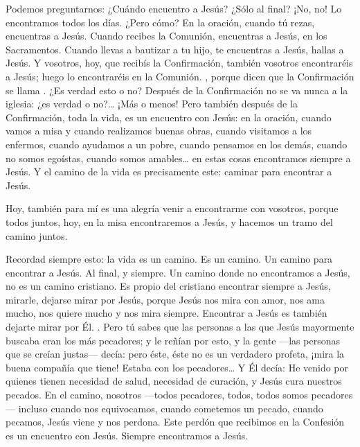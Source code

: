 Podemos preguntarnos: ¿Cuándo encuentro a Jesús? ¿Sólo al final? ¡No, no! Lo encontramos todos los días. ¿Pero cómo? En la oración, cuando tú rezas, encuentras a Jesús. Cuando recibes la Comunión, encuentras a Jesús, en los Sacramentos. Cuando llevas a bautizar a tu hijo, te encuentras a Jesús, hallas a Jesús. Y vosotros, hoy, que recibís la Confirmación, también vosotros encontraréis a Jesús; luego lo encontraréis en la Comunión. , porque dicen que la Confirmación se llama . ¿Es verdad esto o no? Después de la Confirmación no se va nunca a la iglesia: ¿es verdad o no?\ldots{} ¡Más o menos! Pero también después de la Confirmación, toda la vida, es un encuentro con Jesús: en la oración, cuando vamos a misa y cuando realizamos buenas obras, cuando visitamos a los enfermos, cuando ayudamos a un pobre, cuando pensamos en los demás, cuando no somos egoístas, cuando somos amables\ldots{} en estas cosas encontramos siempre a Jesús. Y el camino de la vida es precisamente este: caminar para encontrar a Jesús.

Hoy, también para mí es una alegría venir a encontrarme con vosotros, porque todos juntos, hoy, en la misa encontraremos a Jesús, y hacemos un tramo del camino juntos.

Recordad siempre esto: la vida es un camino. Es un camino. Un camino para encontrar a Jesús. Al final, y siempre. Un camino donde no encontramos a Jesús, no es un camino cristiano. Es propio del cristiano encontrar siempre a Jesús, mirarle, dejarse mirar por Jesús, porque Jesús nos mira con amor, nos ama mucho, nos quiere mucho y nos mira siempre. Encontrar a Jesús es también dejarte mirar por Él. . Pero tú sabes que las personas a las que Jesús mayormente buscaba eran los más pecadores; y le reñían por esto, y la gente ---las personas que se creían justas--- decía: pero éste, éste no es un verdadero profeta, ¡mira la buena compañía que tiene! Estaba con los pecadores\ldots{} Y Él decía: He venido por quienes tienen necesidad de salud, necesidad de curación, y Jesús cura nuestros pecados. En el camino, nosotros ---todos pecadores, todos, todos somos pecadores--- incluso cuando nos equivocamos, cuando cometemos un pecado, cuando pecamos, Jesús viene y nos perdona. Este perdón que recibimos en la Confesión es un encuentro con Jesús. Siempre encontramos a Jesús.

